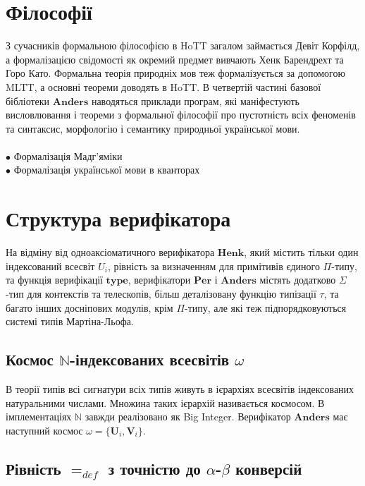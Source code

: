 \documentclass{article}
\theoremstyle{definition}
\begin{document}
\section*{Філософії}

З сучасників формальною філософією в HoTT загалом займається Девіт Корфілд,
а формалізацією свідомості як окремий предмет вивчають Хенк Барендрехт та Горо Като.
Формальна теорія природніх мов теж формалізується за допомогою MLTT,
а основні теореми доводять в HoTT. В четвертій частині базової
бібліотеки $\mathbf{Anders}$ наводяться приклади програм, які
маніфестують висловлювання і теореми з формальної філософії про пустотність
всіх феноменів та синтаксис, морфологію і семантику природньої української мови.
\\
\\
\noindent $\bullet$ Формалізація Мадг'яміки \\
$\bullet$ Формалізація української мови в кванторах

\newpage
\section*{Структура верифікатора}

На відміну від одноаксіоматичного верифікатора $\mathbf{Henk}$, який містить тільки
один індексований всесвіт $U_i$, рівність за визначенням для примітивів єдиного $\Pi$-типу,
та функція верифікації $\mathbf{type}$, верифікатори $\mathbf{Per}$ і $\mathbf{Anders}$ містять додатково
$\Sigma$-тип для контекстів та телескопів, більш деталізовану функцію типізації $\tau$,
та багато інших досніпових модулів, крім $\Pi$-типу, але які теж підпорядковуються системі типів Мартіна-Льофа.

\subsection*{Космос $\mathbb{N}$-індексованих всесвітів $\omega$ }

В теорії типів всі сигнатури всіх типів живуть в ієрархіях
всесвітів індексованих натуральними числами. Множина таких
ієрархій називається космосом. В імплементаціях $\mathbb{N}$
завжди реалізовано як Big Integer. Верифікатор $\mathbf{Anders}$ має
наступний космос $\omega = \{ \mathbf{U}_i, \mathbf{V}_i \}$.

\subsection*{Рівність $=_{def}$ з точністю до $\alpha$-$\beta$ конверсій}
\end{document}
